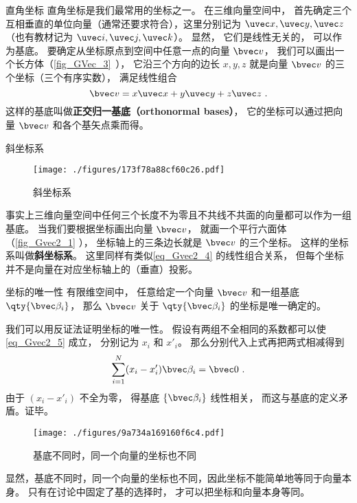 \begin{example}{直角坐标}\label{ex_Gvec2_2}
直角坐标是我们最常用的坐标之一。 在三维向量空间中， 首先确定三个互相垂直的单位向量（通常还要求符合），这里分别记为 $\uvec x, \uvec y, \uvec z$ （也有教材记为 $\uvec i, \uvec j, \uvec k$）。 显然， 它们是线性无关的， 可以作为基底。 要确定从坐标原点到空间中任意一点的向量 $\bvec v$， 我们可以画出一个长方体（\autoref{fig_GVec_3}~）， 它沿三个方向的边长 $x, y, z$ 就是向量 $\bvec v$ 的三个坐标（三个有序实数）， 满足线性组合
\begin{equation}\label{eq_Gvec2_4}
\bvec v = x\uvec x + y\uvec y + z\uvec z~.
\end{equation}
这样的基底叫做\textbf{正交归一基底（orthonormal bases）}， 它的坐标可以通过把向量 $\bvec v$ 和各个基矢点乘而得。
\end{example}

\begin{example}{斜坐标系}\label{ex_Gvec2_1}
\begin{figure}[ht]
\centering
\texttt{[image: ./figures/173f78a88cf60c26.pdf]}
\caption{斜坐标系} \label{fig_Gvec2_1}
\end{figure}
事实上三维向量空间中任何三个长度不为零且不共线不共面的向量都可以作为一组基底。 当我们要根据坐标画出向量 $\bvec v$， 就画一个平行六面体（\autoref{fig_Gvec2_1} ）， 坐标轴上的三条边长就是 $\bvec v$ 的三个坐标。 这样的坐标系叫做\textbf{斜坐标系}。 这里同样有类似\autoref{eq_Gvec2_4} 的线性组合关系， 但每个坐标并不是向量在对应坐标轴上的（垂直）投影。
\end{example}

\begin{theorem}{坐标的唯一性}
有限维空间中， 任意给定一个向量 $\bvec v$ 和一组基底 $\qty{\bvec \beta_i}$， 那么 $\bvec v$ 关于 $\qty{\bvec \beta_i}$ 的坐标是唯一确定的。
\end{theorem}
我们可以用反证法证明坐标的唯一性。 假设有两组不全相同的系数都可以使\autoref{eq_Gvec2_5} 成立， 分别记为 $x_i$ 和 $x'_i$。 那么分别代入上式再把两式相减得到
\begin{equation}
\sum_{i=1}^N (x_i-x'_i) \bvec \beta_i = \bvec 0~.
\end{equation}
由于 $(x_i-x'_i)$ 不全为零， 得基底 $\{\bvec \beta_i\}$ 线性相关， 而这与基底的定义矛盾。证毕。
\begin{figure}[ht]
\centering
\texttt{[image: ./figures/9a734a169160f6c4.pdf]}
\caption{基底不同时，同一个向量的坐标也不同} \label{fig_Gvec2_2}
\end{figure}
显然，基底不同时，同一个向量的坐标也不同，因此坐标不能简单地等同于向量本身。 只有在讨论中固定了基的选择时， 才可以把坐标和向量本身等同。

